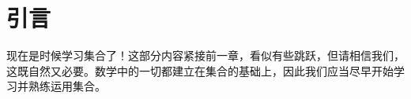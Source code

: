 \section{引言}

现在是时候学习集合了！这部分内容紧接前一章，看似有些跳跃，但请相信我们，这既自然又必要。数学中的一切都建立在集合的基础上，因此我们应当尽早开始学习并熟练运用集合。








